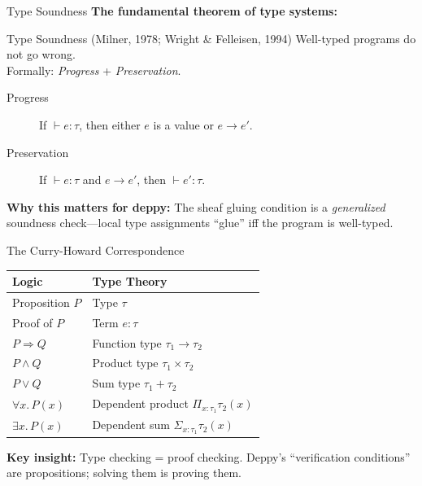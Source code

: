 \documentclass[aspectratio=169,10pt]{beamer}
\begin{document}
\begin{frame}{Type Soundness}
\textbf{The fundamental theorem of type systems:}

\begin{block}{Type Soundness (Milner, 1978; Wright \& Felleisen, 1994)}
Well-typed programs do not go wrong.\\[0.3em]
Formally: \emph{Progress} + \emph{Preservation}.
\end{block}

\vspace{0.3em}
\begin{description}
  \item[Progress] If $\vdash e : \tau$, then either $e$ is a value or $e \to e'$.
  \item[Preservation] If $\vdash e : \tau$ and $e \to e'$, then $\vdash e' : \tau$.
\end{description}

\vspace{0.3em}
\textbf{Why this matters for deppy:} The sheaf gluing condition is a \emph{generalized} soundness check---local type assignments ``glue'' iff the program is well-typed.
\end{frame}

\begin{frame}{The Curry-Howard Correspondence}
\begin{center}
\renewcommand{\arraystretch}{1.4}
\begin{tabular}{@{}ll@{}}
\toprule
\textbf{Logic} & \textbf{Type Theory} \\
\midrule
Proposition $P$ & Type $\tau$ \\
Proof of $P$ & Term $e : \tau$ \\
$P \Rightarrow Q$ & Function type $\tau_1 \to \tau_2$ \\
$P \wedge Q$ & Product type $\tau_1 \times \tau_2$ \\
$P \vee Q$ & Sum type $\tau_1 + \tau_2$ \\
$\forall x.\, P(x)$ & Dependent product $\Pi_{x:\tau_1} \tau_2(x)$ \\
$\exists x.\, P(x)$ & Dependent sum $\Sigma_{x:\tau_1} \tau_2(x)$ \\
\bottomrule
\end{tabular}
\end{center}

\vspace{0.3em}
\textbf{Key insight:} Type checking = proof checking. Deppy's ``verification conditions'' are propositions; solving them is proving them.
\end{frame}
\end{document}

